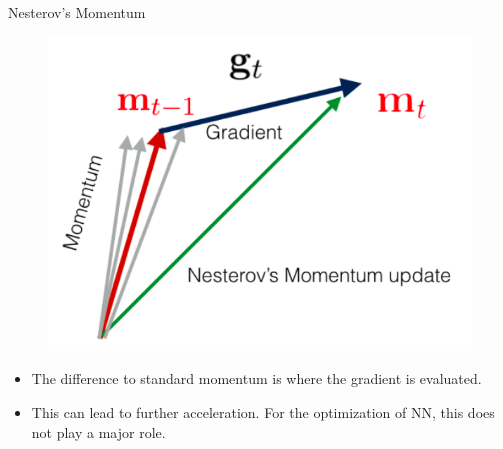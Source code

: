 \documentclass[handout,xcolor=pdftex,dvipsnames,table,mathserif]{beamer}
\begin{document}

\begin{frame}{Nesterov's Momentum}
\begin{figure}
\includegraphics[width=.8\columnwidth]{../graphics/Nesterov}
\end{figure}
\begin{itemize}
	\item The difference to standard momentum is where the gradient is evaluated. 
	\item This can lead to further acceleration. For the optimization of NN, this does not play a major role. 
\end{itemize}
\end{frame}
\end{document}
